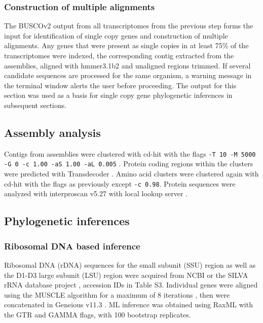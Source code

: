 \documentclass[12pt]{article}
\begin{document}
\subsubsection*{Construction of multiple alignments}
The BUSCOv2 output from all transcriptomes from the previous step forms the input for identification of single copy genes and construction of multiple alignments. 
Any genes that were present as single copies in at least 75\% of the transcriptomes were indexed, the corresponding contig extracted from the assemblies, aligned with hmmer3.1b2 \cite{eddy2015hmmer} and unaligned regions trimmed.
If several candidate sequences are processed for the same organism, a warning message in the terminal window alerts the user before proceeding. 
The output for this section was used as a basis for single copy gene phylogenetic inferences in subsequent sections.

\subsection*{Assembly analysis}
Contigs from assemblies were clustered with cd-hit with the flags \texttt{-T 10 -M 5000 -G 0 -c 1.00 -aS 1.00 -aL 0.005} \cite{fu2012cd}. 
Protein coding regions within the clusters were predicted with Transdecoder \cite{haas2016transdecoder}. 
Amino acid clusters were clustered again with cd-hit with the flags as previously except \texttt{-c 0.98}.
Protein sequences were analyzed with interproscan v5.27 with local lookup server \cite{quevillon2005interproscan}.

\subsection*{Phylogenetic inferences}
\subsubsection*{Ribosomal DNA based inference}
Ribosomal DNA (rDNA) sequences for the small subunit (SSU) region as well as the D1-D3 large subunit (LSU) region were acquired from NCBI \cite{coordinators2017database} or the SILVA rRNA database project \cite{silvaproj}, accession IDs in Table S3. 
Individual genes were aligned using the MUSCLE algorithm for a maximum of 8 iterations \cite{edgar2004muscle}, then were concatenated in Geneious v11.3 \cite{kearse2012geneious}.
ML inference was obtained using RaxML \cite{stamatakis2014raxml} with the GTR and GAMMA flags, with 100 bootstrap replicates.
\end{document}
